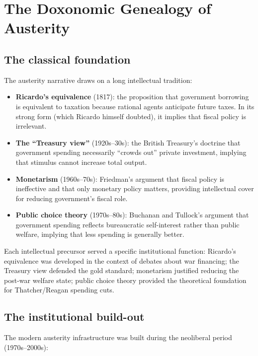 \section{The Doxonomic Genealogy of Austerity}
\label{sec:ch25-genealogy}

\subsection{The classical foundation}

The austerity narrative draws on a long intellectual tradition:
\begin{itemize}[nosep]
  \item \textbf{Ricardo's equivalence} (1817): the proposition that government borrowing is equivalent to taxation because rational agents anticipate future taxes. In its strong form (which Ricardo himself doubted), it implies that fiscal policy is irrelevant.
  \item \textbf{The ``Treasury view''} (1920s--30s): the British Treasury's doctrine that government spending necessarily ``crowds out'' private investment, implying that stimulus cannot increase total output.
  \item \textbf{Monetarism} (1960s--70s): Friedman's argument that fiscal policy is ineffective and that only monetary policy matters, providing intellectual cover for reducing government's fiscal role.
  \item \textbf{Public choice theory} (1970s--80s): Buchanan and Tullock's argument that government spending reflects bureaucratic self-interest rather than public welfare, implying that less spending is generally better.
\end{itemize}

Each intellectual precursor served a specific institutional function: Ricardo's equivalence was developed in the context of debates about war financing; the Treasury view defended the gold standard; monetarism justified reducing the post-war welfare state; public choice theory provided the theoretical foundation for Thatcher/Reagan spending cuts.

\subsection{The institutional build-out}

The modern austerity infrastructure was built during the neoliberal period (1970s--2000s):

